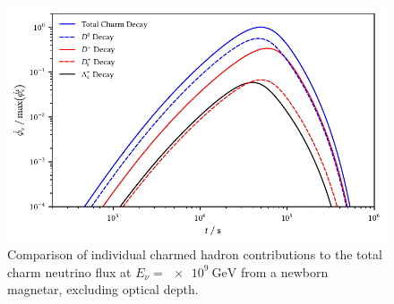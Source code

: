 \begin{figure}[H]
	\centering
	\includegraphics{../plots/build/magnetar_charm_decay_comparison_without.pdf}
	\caption[Magnetar $\nu \kern+0.5pt$ flux from $c$ decay excluding optical depth.]
			{Comparison of individual charmed hadron contributions to the total charm neutrino flux at
			 $E_\nu = \qty{e9}{\giga\electronvolt}$ from a newborn magnetar, excluding optical depth.}
	\label{fig:magnetar-charm-comparison-without}
\end{figure}
